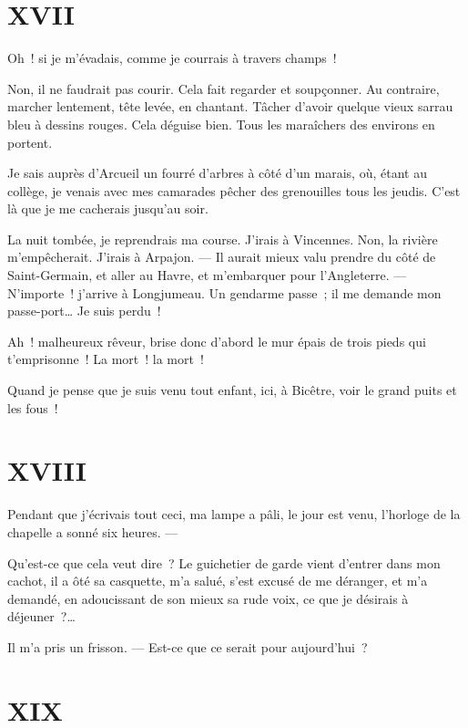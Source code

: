 \documentclass[french,twoside]{book} %
\begin{document}
 \section[{XVII}]{XVII}
\label{ch17}\renewcommand{\leftmark}{XVII}

\noindent Oh ! si je m’évadais, comme je courrais à travers champs !\par
Non, il ne faudrait pas courir. Cela fait regarder et soupçonner. Au contraire, marcher lentement, tête levée, en chantant. Tâcher d’avoir quelque vieux sarrau bleu à dessins rouges. Cela déguise bien. Tous les maraîchers des environs en portent.\par
Je sais auprès d’Arcueil un fourré d’arbres à côté d’un marais, où, étant au collège, je venais avec mes camarades pêcher des grenouilles tous les jeudis. C’est là que je me cacherais jusqu’au soir.\par
La nuit tombée, je reprendrais ma course. J’irais à Vincennes. Non, la rivière m’empêcherait. J’irais à Arpajon. — Il aurait mieux valu prendre du côté de Saint-Germain, et aller au Havre, et m’embarquer pour l’Angleterre. — N’importe ! j’arrive à Longjumeau. Un gendarme passe ; il me demande mon passe-port… Je suis perdu !\par
 Ah ! malheureux rêveur, brise donc d’abord le mur épais de trois pieds qui t’emprisonne ! La mort ! la mort !\par
Quand je pense que je suis venu tout enfant, ici, à Bicêtre, voir le grand puits et les fous !
 \section[{XVIII}]{XVIII}
\label{ch18}\renewcommand{\leftmark}{XVIII}

\noindent Pendant que j’écrivais tout ceci, ma lampe a pâli, le jour est venu, l’horloge de la chapelle a sonné six heures. —\par
Qu’est-ce que cela veut dire ? Le guichetier de garde vient d’entrer dans mon cachot, il a ôté sa casquette, m’a salué, s’est excusé de me déranger, et m’a demandé, en adoucissant de son mieux sa rude voix, ce que je désirais à déjeuner ?…\par
Il m’a pris un frisson. — Est-ce que ce serait pour aujourd’hui ?
 \section[{XIX}]{XIX}
\label{ch19}\renewcommand{\leftmark}{XIX}
\end{document}
